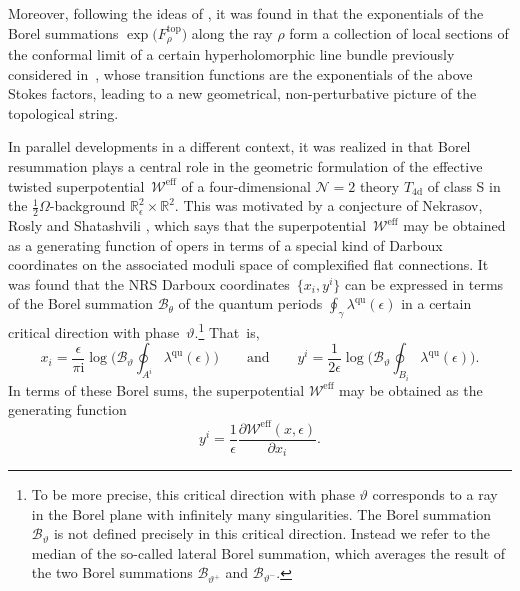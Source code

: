 \documentclass[pdftex]{sigma}
\numberwithin{equation}{section}
\begin{document}
Moreover, following the ideas of \cite{Coman:2018uwk,CLT20}, it was found in \cite{ASTT21} that the exponentials of the Borel summations $\exp\big(F^{\mathrm{top}}_{\rho}\big)$ along the ray $\rho$ form a collection of local sections of the conformal limit of a certain hyperholomorphic line bundle previously considered in~\cite{APP, Neitzke_hyperhol}, whose transition functions are the exponentials of the above Stokes factors, leading to a new geometrical, non-perturbative picture of the topological string.

In parallel developments in a different context, it was realized in \cite{Hollands:Heun,Hollands:recipe} that Borel resummation plays a central role in the geometric formulation of the effective twisted superpotential~$\mathcal{W}^{\mathrm{eff}}$ of a four-dimensional $\mathcal{N}=2$ theory $T_{\mathrm{4d}}$ of class S in the $\frac{1}{2} \Omega$-background $\mathbb{R}^{2}_\epsilon \times \mathbb{R}^{2}$.
This was motivated by a conjecture of Nekrasov, Rosly and Shatashvili \cite{Nekrasov:NRS}, which says that the superpotential~$\mathcal{W}^{\mathrm{eff}}$ may be obtained as a generating function of opers in terms of a special kind of Darboux coordinates on the associated moduli space of complexified flat connections.
It was found that the NRS Darboux coordinates~$\{x_i,y^i\}$ can be expressed in terms of the Borel summation $\mathcal{B}_\theta$ of the quantum periods $\oint_{\gamma}\lambda^{\mathrm{qu}}(\epsilon)$ in a certain critical direction with phase~$\vartheta$.\footnote{To be more precise, this critical direction with phase $\vartheta$ corresponds to a ray in the Borel plane with infinitely many singularities. The Borel summation $\mathcal{B}_{\vartheta}$ is not defined precisely in this critical direction. Instead we refer to the median of the so-called lateral Borel summation, which averages the result of the two Borel summations $\mathcal{B}_{\vartheta^+}$ and $\mathcal{B}_{\vartheta^-}$.} That~is,~
\begin{equation}\label{eqn:NRSBorel}
x_i = \frac{\epsilon}{\pi \mathrm{i}} \log \bigg( \mathcal{B}_\vartheta \oint_{A^i} \lambda^{\mathrm{qu}}(\epsilon) \bigg) \qquad \mathrm{and} \qquad y^i = \frac{1}{2 \epsilon} \log \bigg( \mathcal{B}_\vartheta \oint_{B_i} \lambda^{\mathrm{qu}}(\epsilon) \bigg).
\end{equation}
In terms of these Borel sums, the superpotential $\mathcal{W}^{\mathrm{eff}}$ may be obtained as the generating function%
\begin{equation}\label{eqn:Weff_generatingfunction}
y^i = \frac{1}{\epsilon} \frac{\partial \mathcal{W}^{\mathrm{eff}}(x,\epsilon)}{\partial x_i}.
\end{equation}
\end{document}
